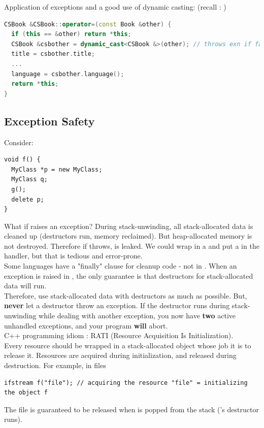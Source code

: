 \documentclass[english, 11pt]{article}
\begin{document}
\begin{exmp}
  Application of exceptions and a good use of dynamic casting: (recall : )
\begin{lstlisting}[language=c++]
CSBook &CSBook::operator=(const Book &other) {
  if (this == &other) return *this;
  CSBook &csbother = dynamic_cast<CSBook &>(other); // throws exn if fails
  title = csbother.title;
  ...
  language = csbother.language();
  return *this;
}
\end{lstlisting}

\subsection{Exception Safety}

Consider:

\begin{lstlisting}
void f() {
  MyClass *p = new MyClass;
  MyClass q;
  g();
  delete p;
}
\end{lstlisting}
What if  raises an exception? During stack-unwinding, all stack-allocated data is cleaned up (destructors run, memory reclaimed). But heap-allocated memory is not destroyed. Therefore if  throws,  is leaked. We could wrap  in a  and put a  in the handler, but that is tedious and error-prone. \\

Some languages have a "finally" clause for cleanup code - not in . When an exception is raised in , the only guarantee is that destructors for stack-allocated data will run. \\

Therefore, use stack-allocated data with destructors as much as possible. But, \textbf{never} let a destructor throw an exception. If the destructor runs during stack-unwinding while dealing with another exception, you now have \textbf{two} active unhandled exceptions, and your program \textbf{will} abort. \\

C++ programming idiom : RATI (Resource Acquisition Is Initialization). \\

Every resource should be wrapped in a stack-allocated object whose job it is to release it. Resources are acquired during initialization, and released during destruction. For example, in files
\begin{lstlisting}
ifstream f("file"); // acquiring the resource "file" = initializing the object f
\end{lstlisting}
The file is guaranteed to be released when  is popped from the stack ('s destructor runs). \\


\end{exmp}
\end{document}
